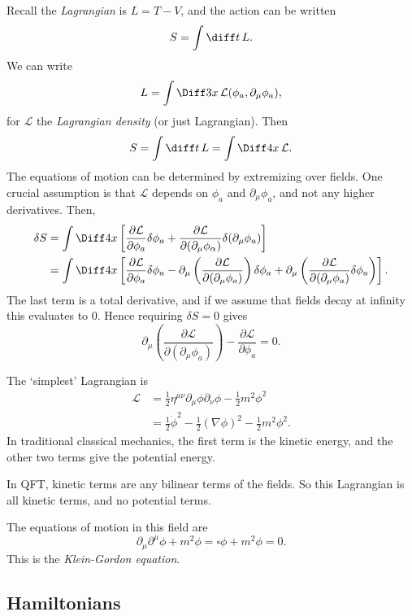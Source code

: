 \documentclass[12pt]{article}
\begin{document}
Recall the \emph{Lagrangian} is $L = T - V$, and the action can be written
\[
S = \int \diff t \, L.
\]
We can write
\[
L = \int \Diff3 x \, \mathcal{L}(\phi_a, \partial_\mu \phi_a),
\]
for $\mathcal{L}$ the \emph{Lagrangian density} (or just Lagrangian). Then
\[
S = \int \diff t\, L = \int \Diff4 x \, \mathcal{L}.
\]
The equations of motion can be determined by extremizing over fields. One crucial assumption is that $\mathcal{L}$ depends on $\phi_a$ and $\partial_\mu \phi_a$, and not any higher derivatives. Then,
\begin{align*}
	\delta S &= \int \Diff4 x \left[ \frac{\partial \mathcal{L}}{\partial \phi_a} \delta \phi_a + \frac{\partial \mathcal{L}}{\partial(\partial_\mu \phi_\alpha)} \delta(\partial_\mu \phi_a) \right] \\
		 &= \int \Diff4 x \left[ \frac{\partial \mathcal{L}}{\partial \phi_a} \delta \phi_a - \partial_\mu \left( \frac{\partial \mathcal{L}}{\partial(\partial_\mu \phi_a)} \right) \delta \phi_a + \partial_\mu \left( \frac{\partial \mathcal{L}}{\partial (\partial_\mu \phi_a)} \delta \phi_a \right) \right].
\end{align*}
The last term is a total derivative, and if we assume that fields decay at infinity this evaluates to $0$. Hence requiring $\delta S = 0$ gives
\[
\partial_\mu \left( \frac{\partial \mathcal{L}}{\partial (\partial _\mu \phi_a)} \right) - \frac{\partial \mathcal{L}}{\partial \phi_a} = 0.
\]
\begin{exbox}
	The `simplest' Lagrangian is
	\begin{align*}
		\mathcal{L} &= \frac{1}{2} \eta^{\mu\nu} \partial_\mu \phi \partial_\nu \phi - \frac{1}{2} m^2 \phi^2 \\
			    &= \frac{1}{2} \dot \phi^2 - \frac{1}{2} ( \nabla \phi)^2 - \frac{1}{2} m^2 \phi^2.
	\end{align*}
	In traditional classical mechanics, the first term is the kinetic energy, and the other two terms give the potential energy.

	In QFT, kinetic terms are any bilinear terms of the fields. So this Lagrangian is all kinetic terms, and no potential terms.

	The equations of motion in this field are
	\[
	\partial_\mu \partial^\mu \phi + m^2 \phi = \square \phi + m^2 \phi = 0.
	\]
	This is the \emph{Klein-Gordon equation}.
\end{exbox}


\subsection{Hamiltonians}%
\label{sub:ham}
\end{document}
